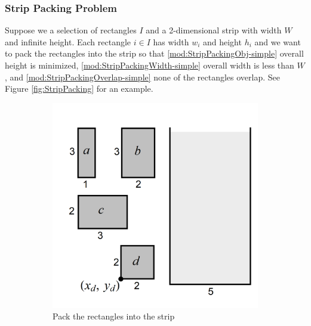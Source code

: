 \subsubsection{Strip Packing Problem}
Suppose we a selection of rectangles $I$ and a 2-dimensional strip with width $W$ and infinite height. Each rectangle $i \in I$ has width $w_i$ and 
height $h_i$ and we want to pack the rectangles into the strip so that \eqref{mod:StripPackingObj-simple} overall height is minimized, \eqref{mod:StripPackingWidth-simple} overall width is less than $W$, and \eqref{mod:StripPackingOverlap-simple} none of the rectangles overlap. See Figure \ref{fig:StripPacking} for an example.
	\begin{figure}[h!]
	\begin{subfigure}[b]{.6\textwidth}
	\centering
	\includegraphics[height=.4\textheight]{Figures/StripPacking0}
	\caption{Pack the rectangles into the strip}
	\label{fig:StripPacking-PackStrip}
	\end{subfigure}
	\hfill
	\begin{subfigure}[b]{.3\textwidth}
	\centering

\end{subfigure}
\end{figure}
